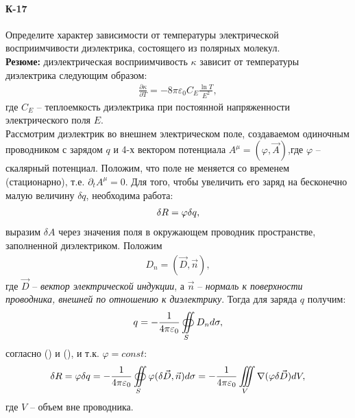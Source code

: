 \documentclass[__main__.tex]{subfiles}
\begin{document}
\paragraph{К-17}
Определите характер зависимости от температуры электрической восприимчивости диэлектрика, состоящего из полярных молекул.\\

\textbf{Резюме:} диэлектрическая восприимчивость $\kappa$ зависит от температуры диэлектрика следующим образом:
\begin{gather}
\frac{\partial\kappa}{\partial T} = -8\pi\varepsilon_0C_E\frac{\ln T}{E^2},
\end{gather}
где $C_E$ -- теплоемкость диэлектрика при постоянной напряженности электрического поля $E$.\\

Рассмотрим диэлектрик во внешнем электрическом поле, создаваемом одиночным проводником с зарядом $q$ и 4-х вектором потенциала $A^\mu=(\varphi,\vec{A})$,где $\varphi$ -- скалярный потенциал. Положим, что поле не меняется со временем (стационарно), т.е. $\partial_t A^\mu=0$. Для того, чтобы увеличить его заряд на бесконечно малую величину $\delta q$, необходима работа:
\begin{gather}
\delta R = \varphi\delta q,\llabel{eq:work}
\end{gather}
выразим $\delta A$ через значения поля в окружающем проводник пространстве, заполненной диэлектриком. Положим
\begin{gather}
D_n = (\vec{D},\vec{n}),
\end{gather}
где $\vec{D}$ -- \emph{вектор электрической индукции}, а $\vec{n}$ -- \emph{нормаль к поверхности проводника, внешней по отношению к диэлектрику}. Тогда для заряда $q$ получим:
\begin{gather}
q = -\frac{1}{4\pi\varepsilon_0}\oiint\limits_{S}D_n d\sigma,\llabel{eq:q}
\end{gather}
согласно () и (), и т.к. $\varphi=const$:
\begin{gather}
\delta R = \varphi\delta q =
-\frac{1}{4\pi\varepsilon_0}\oiint\limits_{S}\varphi(\delta\vec{D},\vec{n})d\sigma =
-\frac{1}{4\pi\varepsilon_0}\iiint\limits_{V}\nabla(\varphi\delta\vec{D})dV, \llabel{eq:workq}
\end{gather}
где $V$ -- объем вне проводника.
\end{document}
